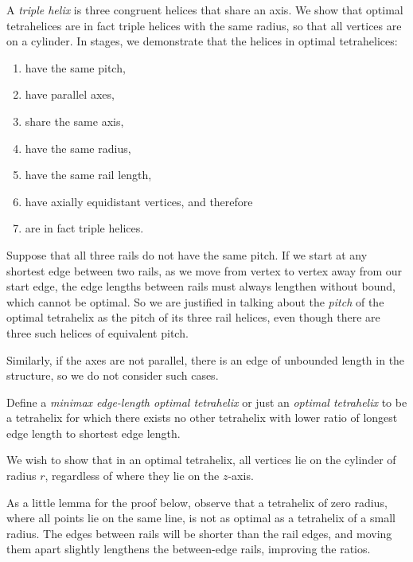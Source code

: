 \documentclass[twocolumn,10pt]{asme2ej}
\begin{document}
A \emph{triple helix} is three congruent helices that share an axis. We show that
optimal tetrahelices are in fact triple helices with the same radius, so that all
vertices are on a cylinder. In stages, we demonstrate that the helices in optimal tetrahelices:
\begin{enumerate}
\item have the same pitch,
\item have parallel axes,
\item share the same axis,
\item have the same radius,
\item have the same rail length,
\item have axially equidistant vertices, and therefore
\item are in fact triple helices.
\end{enumerate}

Suppose that all three rails do not have the same pitch. If we start at any shortest edge between
two rails, as we move
from vertex to vertex away from our start edge, the edge lengths
between rails must always lengthen without bound,
which cannot be optimal.
So we are justified in talking about the
\emph{pitch} of 
the optimal tetrahelix as the pitch of its three rail helices, even though there are
three such helices of equivalent pitch.

Similarly, if the axes are not parallel, there is an edge of
unbounded length in the structure, so we do not consider such cases.

Define a \emph{minimax edge-length optimal tetrahelix} or just an
\emph{optimal tetrahelix} to be a tetrahelix for which there exists
no other tetrahelix with lower ratio of longest edge length to shortest edge length.

We wish to show that in an optimal tetrahelix, all vertices lie on the cylinder
of radius $r$, regardless of where they lie on the $z$-axis.

As a little lemma for the proof below, observe that a tetrahelix of zero radius, where
all points lie on the same line,
is not as optimal as a tetrahelix of a small radius. The edges between rails will be
shorter than the rail edges, and moving them apart slightly lengthens the between-edge
rails, improving the ratios.
\end{document}
